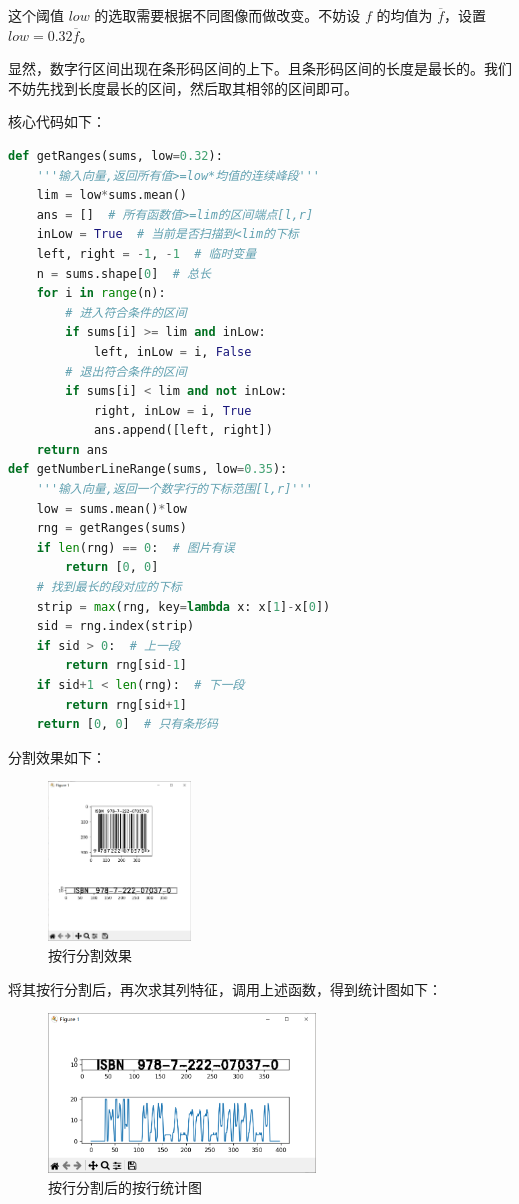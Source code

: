 \documentclass{ctexart}
\begin{document}
这个阈值 $low$ 的选取需要根据不同图像而做改变。不妨设 $f$ 的均值为 $\overline{f}$，设置 $low=0.32\overline{f}$。 

显然，数字行区间出现在条形码区间的上下。且条形码区间的长度是最长的。我们不妨先找到长度最长的区间，然后取其相邻的区间即可。

核心代码如下：
\begin{lstlisting}[language=python]
def getRanges(sums, low=0.32):
    '''输入向量,返回所有值>=low*均值的连续峰段'''
    lim = low*sums.mean()
    ans = []  # 所有函数值>=lim的区间端点[l,r]
    inLow = True  # 当前是否扫描到<lim的下标
    left, right = -1, -1  # 临时变量
    n = sums.shape[0]  # 总长
    for i in range(n):
        # 进入符合条件的区间
        if sums[i] >= lim and inLow:
            left, inLow = i, False
        # 退出符合条件的区间
        if sums[i] < lim and not inLow:
            right, inLow = i, True
            ans.append([left, right])
    return ans
def getNumberLineRange(sums, low=0.35):
    '''输入向量,返回一个数字行的下标范围[l,r]'''
    low = sums.mean()*low
    rng = getRanges(sums)
    if len(rng) == 0:  # 图片有误
        return [0, 0]
    # 找到最长的段对应的下标
    strip = max(rng, key=lambda x: x[1]-x[0])
    sid = rng.index(strip)
    if sid > 0:  # 上一段
        return rng[sid-1]
    if sid+1 < len(rng):  # 下一段
        return rng[sid+1]
    return [0, 0]  # 只有条形码
\end{lstlisting}

分割效果如下：
\begin{figure}[H]
    \centering
    \includegraphics[height=120pt]{sample_splitRow2}
    \caption{按行分割效果}
\end{figure}

将其按行分割后，再次求其列特征，调用上述函数，得到统计图如下：
\begin{figure}[H]
    \centering
    \includegraphics[height=120pt]{sample_splitRow_ana2}
    \caption{按行分割后的按行统计图}
\end{figure}
\end{document}
